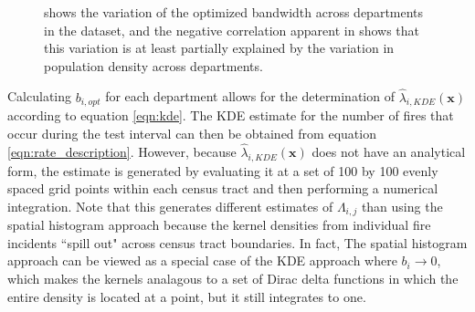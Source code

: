 \documentclass{svjour3}
\begin{document}
\begin{figure}[!htb]
       \begin{center}
      \end{center}
      \caption{\protect{} shows the variation of the optimized bandwidth across departments in the dataset, and the negative correlation apparent in \protect{} shows that this variation is at least partially explained by the variation in population density across departments.}
     \label{fig:band_optimization}
  \end{figure}
  
  Calculating $b_{i,opt}$ for each department allows for the determination of $\hat\lambda_{i,KDE}(\textbf{x})$ according to equation \ref{eqn:kde}. The KDE estimate for the number of fires that occur during the test interval can then be obtained from equation \ref{eqn:rate_description}. However, because $\hat\lambda_{i,KDE}(\textbf{x})$ does not have an analytical form, the estimate is generated by evaluating it at a set of 100 by 100 evenly spaced grid points within each census tract and then performing a numerical integration. Note that this generates different estimates of  $\Lambda_{i,j}$ than using the spatial histogram approach because the kernel densities from individual fire incidents ``spill out" across census tract boundaries. In fact, The spatial histogram approach can be viewed as a special case of the KDE approach where $b_i \rightarrow 0$, which makes the kernels analagous to a set of Dirac delta functions in which the entire density is located at a point, but it still integrates to one.
  
\end{document}
